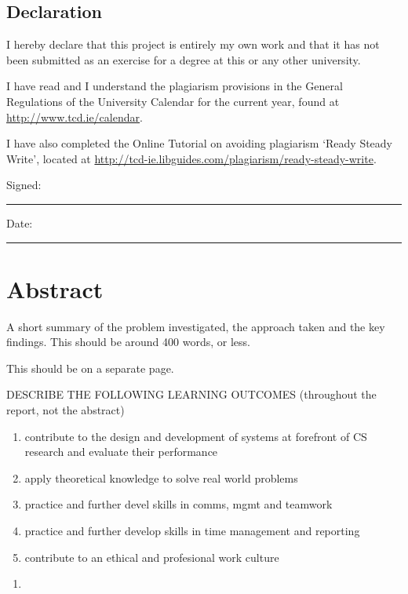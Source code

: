 \section*{\Huge{Declaration}}
\vspace{1cm}
I hereby declare that this project is entirely my own work and that it has not been submitted as an exercise for a degree at this or any other university.

\vspace{1cm}
I have read and I understand the plagiarism provisions in the General Regulations of the University Calendar for the current year, found at \url{http://www.tcd.ie/calendar}.
\vspace{1cm}

I have also completed the Online Tutorial on avoiding plagiarism `Ready Steady Write', located at
\url{http://tcd-ie.libguides.com/plagiarism/ready-steady-write}.
\vspace{3cm}

Signed:~\rule{5cm}{0.3pt}\hfill Date:~\rule{5cm}{0.3pt}

\chapter*{Abstract}
A short summary of the problem investigated, the approach taken and the key findings. This should be around 400 words, or less.

This should be on a separate page.

DESCRIBE THE FOLLOWING LEARNING OUTCOMES (throughout the report, not the abstract)
\begin{enumerate}
	\item contribute to the design and development of systems at forefront of CS research and evaluate their performance
	\item apply theoretical knowledge to solve real world problems
	\item practice and further devel skills in comms, mgmt and teamwork
	\item practice and further develop skills in time management and reporting
	\item contribute to an ethical and profesional work culture
\end{enumerate}

\begin{enumerate}
	\item 
\end{enumerate}

\newpage
\onehalfspacing\raggedright %

